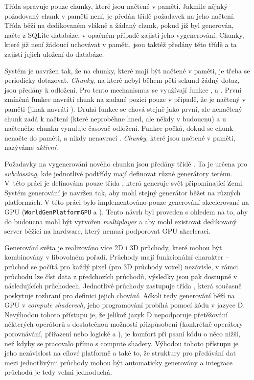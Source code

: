 Třída  spravuje pouze chunky, které jsou načtené v paměti. Jakmile nějaký požadovaný chunk v paměti není, je předán třídě  požadavek na jeho načtení. Třída  běží na dedikovaném vlákně a žádaný chunk, pokud již byl generován, načte z SQLite databáze, v opačném případě zajistí jeho vygenerování. Chunky, které již není žádoucí uchovávat v paměti, jsou taktéž předány této třídě a ta zajistí jejich uložení do databáze.

Systém je navržen tak, že na chunky, které mají být načtené v paměti, je třeba se periodicky dotazovat. \textit{Chunky}, na které nebyl během pěti sekund žádný dotaz, jsou předány k odložení. Pro tento mechanismus se využívají funkce ,  a . První zmíněná funkce navrátí chunk na zadané pozici pouze v případě, že je načtený v paměti (jinak navrátí ). Druhá funkce se chová stejně jako první, ale nenačtený chunk zadá k načtení (které neproběhne hned, ale někdy v budoucnu) a u načteného chunku vynuluje časovač odložení. Funkce  počká, dokud se chunk nenačte do paměti, a nikdy nenavrací . \textit{Chunky}, které jsou načtené v paměti, nazýváme \textit{aktivní}.

Požadavky na vygenerování nového chunku jsou předány třídě . Ta je určena pro \textit{subclassing}, kde jednotlivé podtřídy mají definovat různé generátory terénu. V~této práci je definována pouze třída , která generuje svět připomínající Zemi. Systém generování je navržen tak, aby mohl stejný generátor běžet na různých platformách. V této práci bylo implementováno pouze generování akcelerované na GPU (\texttt{WorldGen\-PlatformGPU} a ). Tento návrh byl proveden s ohledem na to, aby do budoucna mohl být vytvořen \textit{multiplayer} a aby mohl existovat dedikovaný server běžící na hardware, který nemusí podporovat GPU akceleraci.

Generování světa je realizováno více 2D i 3D průchody, které mohou být kombinovány v libovolném pořadí. Průchody mají funkcionální charakter -- průchod se počítá pro každý pixel (pro 3D průchody voxel) nezávisle, v rámci průchodu lze číst data z předchozích průchodů, výsledky jsou pak dostupné v následujících průchodech. Jednotlivé průchody zastupuje třída , která současně poskytuje rozhraní pro definici jejich chování. Ačkoli tedy generování běží na GPU v \textit{compute shaderech}, jeho programování probíhá pomocí kódu v jazyce D. Nevýhodou tohoto přístupu je, že jelikož jazyk D nepodporuje přetěžování některých operátorů s dostatečnou možností přizpůsobení (konkrétně operátory porovnávání, přiřazení nebo logické \inlineDCode{&&} a \inlineDCode{||}), je komfort při psaní kódu o něco nižší, než kdyby se pracovalo přímo s compute shadery. Výhodou tohoto přístupu je jeho nezávislost na cílové platformě a také to, že struktury pro předávání dat mezi jednotlivými průchody mohou být automaticky generovány a integrace průchodů je tedy velmi jednoduchá.

